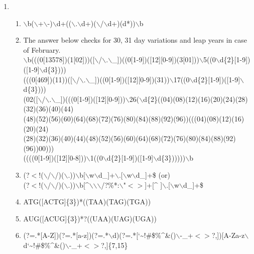 \documentclass[11pt,a4paper]{article}
\begin{document}
\begin{enumerate}
\vspace{5em}
\item{
\begin{enumerate}
\item {$\backslash$b($\backslash$+\textbar$\backslash$-\textbar  )$\backslash$d+(($\backslash$.$\backslash$d+)\textbar($\backslash$/$\backslash$d+)\textbar (d*))$\backslash$b}
\item { The answer below checks for 30, 31 day variations and leap years in case of February. \\
$\backslash$b(((0[13578])\textbar(1[02]))([$\backslash$/$\backslash$.$\backslash$\_])((0[1-9])\textbar([12][0-9])\textbar(3[01]))$\backslash$5((0$\backslash$d\{2\}[1-9])\textbar([1-9]$\backslash$d\{3\})))\textbar\\(((0[469])\textbar(11))([$\backslash$/$\backslash$.$\backslash$\_])((0[1-9])\textbar([12][0-9])\textbar(31))$\backslash$17((0$\backslash$d\{2\}[1-9])\textbar([1-9]$\backslash$d\{3\})))\textbar\\(02([$\backslash$/$\backslash$.$\backslash$\_])(((0[1-9])\textbar([12][0-9]))$\backslash$26($\backslash$d\{2\}((04)\textbar(08)\textbar(12)\textbar(16)\textbar(20)\textbar(24)\textbar(28)\textbar(32)\textbar(36)\textbar(40)\textbar(44)\\\textbar(48)\textbar(52)\textbar(56)\textbar(60)\textbar(64)\textbar(68)\textbar(72)\textbar(76)\textbar(80)\textbar(84)\textbar(88)\textbar(92)\textbar(96))\textbar(((04)\textbar(08)\textbar(12)\textbar(16)\textbar(20)\textbar(24)\textbar\\(28)\textbar(32)\textbar(36)\textbar(40)\textbar(44)\textbar(48)\textbar(52)\textbar(56)\textbar(60)\textbar(64)\textbar(68)\textbar(72)\textbar(76)\textbar(80)\textbar(84)\textbar(88)\textbar(92)\textbar(96))00)))\textbar\\((((0[1-9])\textbar([12][0-8]))$\backslash$1((0$\backslash$d\{2\}[1-9])\textbar([1-9]$\backslash$d\{3\})))))$\backslash$b}
\item {(?$<$!($\backslash$/$\backslash$/)\textbar($\backslash$.))$\backslash$b[$\backslash$w$\backslash$d\_]+$\backslash$.[$\backslash$w$\backslash$d\_]+\$ (or) \\
(?$<$!($\backslash$/$\backslash$/)\textbar($\backslash$.))$\backslash$b[\string^$\backslash${$\backslash$}{$\backslash$}/?\%*:$\backslash$\textbar"$<>$]+[\string^{} ]$\backslash$.[$\backslash$w$\backslash$d\_]+\$}
\item {ATG([ACTG]\{3\})*((TAA)\textbar(TAG)\textbar(TGA))}
\item{ AUG([ACUG]\{3\})*?((UAA)\textbar(UAG)\textbar(UGA))}
\item {(?=.*[A-Z])(?=.*[a-z])(?=.*$\backslash$d)(?=.*[\char`\~{}!\#\$\%\string^{}\&()$\backslash$-\_+$<>$?,])[A-Za-z$\backslash$d\char`\~{}!\#\$\%\string^{}\&()$\backslash$-\_+$<>$?,]\{7,15\}}
\end{enumerate}}

\end{enumerate}
\end{document}
